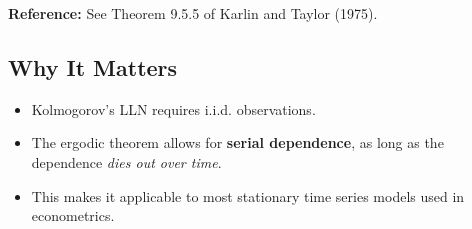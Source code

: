 \documentclass[12pt, oneside]{article}
\begin{document}
\textbf{Reference:} See Theorem 9.5.5 of Karlin and Taylor (1975).

\subsection*{Why It Matters}

\begin{itemize}
  \item Kolmogorov’s LLN requires i.i.d. observations.
  \item The ergodic theorem allows for \textbf{serial dependence}, as long as the dependence \textit{dies out over time}.
  \item This makes it applicable to most stationary time series models used in econometrics.
\end{itemize}
\end{document}
